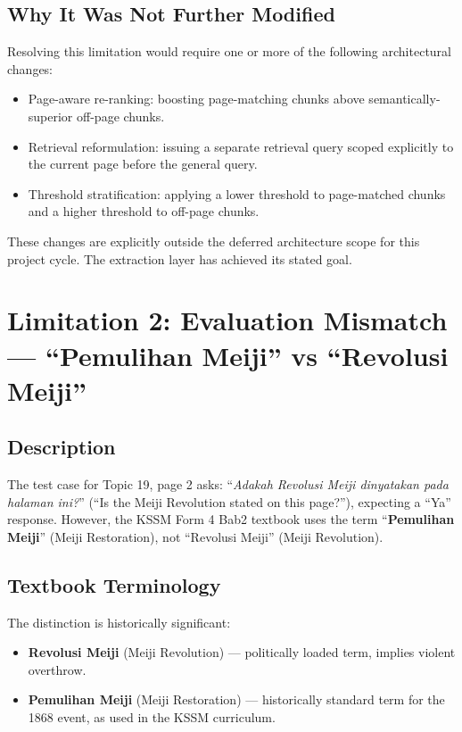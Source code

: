 \documentclass[12pt, a4paper]{report}
\begin{document}
\subsection{Why It Was Not Further Modified}

Resolving this limitation would require one or more of the following
architectural changes:
\begin{itemize}[noitemsep]
  \item Page-aware re-ranking: boosting page-matching chunks above
        semantically-superior off-page chunks.
  \item Retrieval reformulation: issuing a separate retrieval query scoped
        explicitly to the current page before the general query.
  \item Threshold stratification: applying a lower threshold to page-matched
        chunks and a higher threshold to off-page chunks.
\end{itemize}

These changes are explicitly outside the deferred architecture scope for
this project cycle. The extraction layer has achieved its stated goal.

\section{Limitation 2: Evaluation Mismatch — ``Pemulihan Meiji'' vs ``Revolusi Meiji''}
\label{sec:limit2}

\subsection{Description}

The test case for Topic 19, page 2 asks: ``\textit{Adakah Revolusi Meiji
dinyatakan pada halaman ini?}'' (``Is the Meiji Revolution stated on this
page?''), expecting a ``Ya'' response. However, the KSSM Form 4 Bab2 textbook
uses the term ``\textbf{Pemulihan Meiji}'' (Meiji Restoration), not
``Revolusi Meiji'' (Meiji Revolution).

\subsection{Textbook Terminology}

The distinction is historically significant:
\begin{itemize}[noitemsep]
  \item \textbf{Revolusi Meiji} (Meiji Revolution) — politically loaded term,
        implies violent overthrow.
  \item \textbf{Pemulihan Meiji} (Meiji Restoration) — historically standard
        term for the 1868 event, as used in the KSSM curriculum.
\end{itemize}
\end{document}
